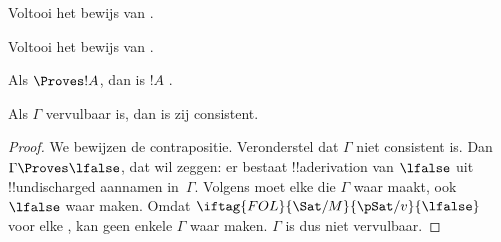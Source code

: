\documentclass[../../../include/open-logic-section]{subfiles}
\begin{document}
\begin{prob}
Voltooi het bewijs van .
\end{prob}
\tagendprob

\begin{prob}
Voltooi het bewijs van .
\end{prob}
\tagendprob

\begin{cor}
Als $\Proves !A$, dan is $!A$ .
\end{cor}

\begin{cor}
Als $\Gamma$ vervulbaar is, dan is zij consistent.
\end{cor}

\begin{proof}
We bewijzen de contrapositie. Veronderstel dat $\Gamma$ niet
consistent is. Dan $\Gamma \Proves \lfalse$, dat wil zeggen: er bestaat
!!a{derivation} van $\lfalse$ uit !!{undischarged} aannamen
in~$\Gamma$. Volgens  moet elke
die $\Gamma$ waar maakt, ook $\lfalse$ waar maken. Omdat
$\iftag{FOL}{\Sat/{M}}{\pSat/{v}}{\lfalse}$ voor elke
,
kan geen enkele  $\Gamma$
waar maken. $\Gamma$ is dus niet vervulbaar.
\end{proof}
\end{document}
